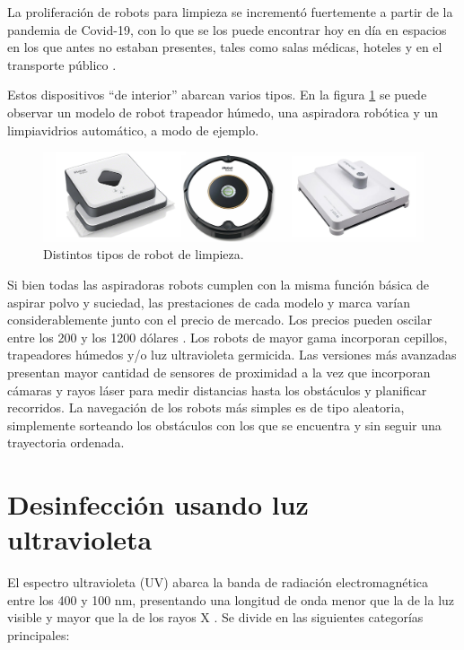 La proliferación de robots para limpieza se incrementó fuertemente a partir de la pandemia de Covid-19, con lo que se los puede encontrar hoy en día en espacios en los que antes no estaban presentes, tales como salas médicas,  hoteles y en el transporte público \citep{Cleaning}. 

Estos dispositivos “de interior” abarcan varios tipos. En la  figura \ref{fig:robotslimpieza} se puede observar un modelo de robot trapeador húmedo, una aspiradora robótica y un limpiavidrios automático, a modo de ejemplo.

\begin{figure}[h]
	\centering
	\includegraphics[width=\textwidth]{./Figures/robotslimpieza.jpg}
	\caption{Distintos tipos de robot de limpieza\protect\footnotemark.}
	\label{fig:robotslimpieza}
\end{figure}

Si bien todas las aspiradoras robots cumplen con la misma función básica de aspirar polvo y suciedad, las prestaciones de cada modelo y marca varían considerablemente junto con el precio de mercado. Los precios pueden oscilar entre los 200 y los 1200 dólares \citep{roomba}.
Los robots de mayor gama incorporan cepillos, trapeadores húmedos y/o luz ultravioleta germicida. Las versiones más avanzadas  presentan mayor cantidad de sensores de proximidad a la vez que incorporan cámaras y rayos láser para medir distancias hasta los obstáculos y planificar recorridos. 
La navegación de los robots más simples es de tipo aleatoria, simplemente  sorteando los obstáculos con los que se encuentra y sin seguir una trayectoria ordenada. 




\section{Desinfección usando luz ultravioleta}

El espectro ultravioleta (UV) abarca la banda de radiación electromagnética entre los 400 y 100 nm, presentando una longitud de onda menor que la de la luz visible y mayor que la de los rayos X \citep{lit}. Se divide en las siguientes categorías principales:

